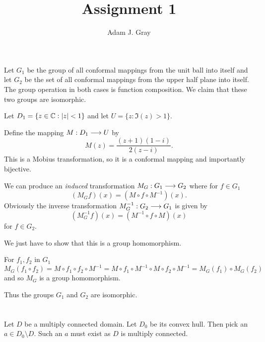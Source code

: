 \documentclass{unswmaths}
\begin{document}
\author{Adam J. Gray}
\title{Assignment 1}
\subject{Complex Analysis}

\newcommand{\llra}{\Leftrightarrow}

\unswtitle

\section{}
\section{}
\section{}

Let $ G_1 $ be the group of all conformal mappings from the unit ball into itself and let $ G_2 $ be the set of all conformal mappings from the upper half plane into itself. The group operation in both cases is function composition.  We claim that these two groups are isomorphic. 

Let $ D_1 = \{ z \in \mathbb{C} : |z| < 1 \} $ and let $ U = \{ z : \Im(z) > 1 \} $.

Define the mapping $ M : D_1 \longrightarrow U $ by
$$ M(z) = \frac{(z+1)(1-i)}{2(z-i)}.$$
This is a Mobius transformation, so it is a conformal mapping and importantly bijective. 

We can produce an \emph{induced} transformation $ M_G : G_1 \longrightarrow G_2 $ where for $ f \in G_1 $
$$
	(M_G f)(x) = (M \circ f \circ M^{-1})(x).
$$
Obviously the inverse transformation $ M^{-1}_G : G_2 \longrightarrow G_1 $ is given by 
$$
	(M^{-1}_G f)(x) = (M^{-1} \circ f \circ M)(x) 
$$
for $ f \in G_2 $.

We just have to show that this is a group homomorphism.  

For $ f_1, f_2 $ in $ G_1 $
$$ M_G(f_1 \circ f_2) = M\circ f_1 \circ f_2 \circ M^{-1} = M\circ f_1 \circ M^{-1} \circ M \circ f_2 \circ M^{-1} = M_G(f_1) \circ M_G(f_2) $$
and so $ M_G $ is a group homomorphism. 

Thus the groups $ G_1 $ and $ G_2 $ are isomorphic. 

\section{}
Let $ D $ be a multiply connected domain. Let $ D_0 $ be its convex hull. Then pick an $ a \in D_0 \setminus D $. Such an $ a $ must exist as $ D $ is multiply connected.
\end{document}
